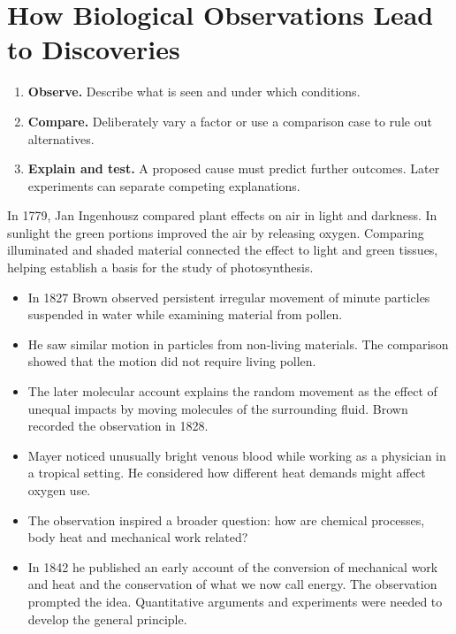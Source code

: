 \documentclass[12pt,a4paper]{article}
\begin{document}
\section{How Biological Observations Lead to Discoveries}
\begin{enumerate}[leftmargin=*, itemsep=3pt, topsep=4pt]
  \item \textbf{Observe.} Describe what is seen and under which conditions.
  \item \textbf{Compare.} Deliberately vary a factor or use a comparison case to rule out alternatives.
  \item \textbf{Explain and test.} A proposed cause must predict further outcomes. Later experiments can separate competing explanations.
\end{enumerate}
\begin{tcolorbox}[examplebox, title={An eighteenth-century example: Ingenhousz}]
In 1779, Jan Ingenhousz compared plant effects on air in light and darkness. In sunlight the green portions improved the air by releasing oxygen. Comparing illuminated and shaded material connected the effect to light and green tissues, helping establish a basis for the study of photosynthesis.
\end{tcolorbox}

\begin{tcolorbox}[examplebox, title={Robert Brown and irregular particle motion}]
\begin{itemize}[leftmargin=*, itemsep=3pt, topsep=4pt]
  \item In 1827 Brown observed persistent irregular movement of minute particles suspended in water while examining material from pollen.
  \item He saw similar motion in particles from non-living materials. The comparison showed that the motion did not require living pollen.
  \item The later molecular account explains the random movement as the effect of unequal impacts by moving molecules of the surrounding fluid. Brown recorded the observation in 1828.
\end{itemize}
\end{tcolorbox}

\begin{tcolorbox}[examplebox, title={Julius Robert Mayer and energy conservation}]
\begin{itemize}[leftmargin=*, itemsep=3pt, topsep=4pt]
  \item Mayer noticed unusually bright venous blood while working as a physician in a tropical setting. He considered how different heat demands might affect oxygen use.
  \item The observation inspired a broader question: how are chemical processes, body heat and mechanical work related?
  \item In 1842 he published an early account of the conversion of mechanical work and heat and the conservation of what we now call energy. The observation prompted the idea. Quantitative arguments and experiments were needed to develop the general principle.
\end{itemize}
\end{tcolorbox}
\end{document}
